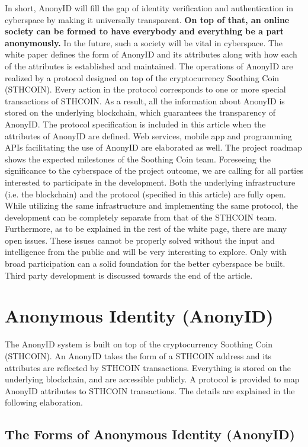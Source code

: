 \documentclass[12pt, a4paper]{article}
\begin{document}
In short, AnonyID will fill the gap of identity verification and authentication in cyberspace by making it universally transparent. \textbf{On top of that, an online society can be formed to have everybody and everything be a part anonymously.} In the future, such a society will be vital in cyberspace. The white paper defines the form of AnonyID and its attributes along with how each of the attributes is established and maintained. The operations of AnonyID are realized by a protocol designed on top of the cryptocurrency Soothing Coin (STHCOIN). Every action in the protocol corresponds to one or more special transactions of STHCOIN. As a result, all the information about AnonyID is stored on the underlying blockchain, which guarantees the transparency of AnonyID. The protocol specification is included in this article when the attributes of AnonyID are defined. Web services, mobile app and programming APIs facilitating the use of AnonyID are elaborated as well. The project roadmap shows the expected milestones of the Soothing Coin team. Foreseeing the significance to the cyberspace of the project outcome, we are calling for all parties interested to participate in the development. Both the underlying infrastructure (i.e. the blockchain) and the protocol (specified in this article) are fully open. While utilizing the same infrastructure and implementing the same protocol, the development can be completely separate from that of the STHCOIN team. Furthermore, as to be explained in the rest of the white page, there are many open issues. These issues cannot be properly solved without the input and intelligence from the public and will be very interesting to explore. Only with broad participation can a solid foundation for the better cyberspace be built. Third party development is discussed towards the end of the article.

\section{Anonymous Identity (AnonyID)}

The AnonyID system is built on top of the cryptocurrency Soothing Coin (STHCOIN). An AnonyID takes the form of a STHCOIN address and its attributes are reflected by STHCOIN transactions. Everything is stored on the underlying blockchain, and are accessible publicly. A protocol is provided to map AnonyID attributes to STHCOIN transactions. The details are explained in the following elaboration.

\subsection{The Forms of Anonymous Identity (AnonyID)}
\end{document}
